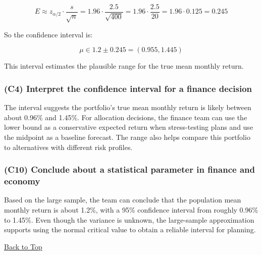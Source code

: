 \[
E \approx z_{\alpha/2} \cdot \frac{s}{\sqrt{n}}
= 1.96 \cdot \frac{2.5}{\sqrt{400}}
= 1.96 \cdot \frac{2.5}{20}
= 1.96 \cdot 0.125
= 0.245
\]

So the confidence interval is:

\[
\mu \in 1.2 \pm 0.245 = (0.955, 1.445)
\]

This interval estimates the plausible range for the true mean monthly return.

\subsubsection{(C4) Interpret the confidence interval for a finance decision}\label{subsubsec:interval-example2-c4}

The interval suggests the portfolio's true mean monthly return is likely between about 0.96\% and 1.45\%. For allocation decisions, the finance team can use the lower bound as a conservative expected return when stress-testing plans and use the midpoint as a baseline forecast. The range also helps compare this portfolio to alternatives with different risk profiles.

\subsubsection{(C10) Conclude about a statistical parameter in finance and economy}\label{subsubsec:interval-example2-c10}

Based on the large sample, the team can conclude that the population mean monthly return is about 1.2\%, with a 95\% confidence interval from roughly 0.96\% to 1.45\%. Even though the variance is unknown, the large-sample approximation supports using the normal critical value to obtain a reliable interval for planning.

\vspace{6pt}
\noindent\hyperref[table-of-contents]{Back to Top}
